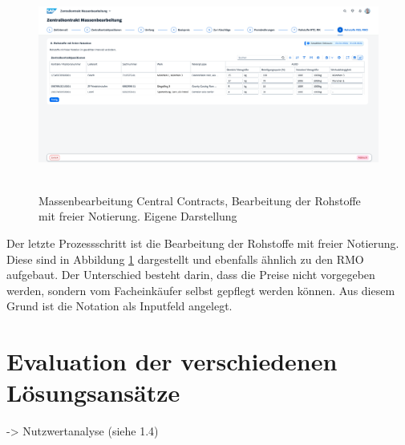 \begin{figure}[H]
    \centering
    \includegraphics[height=6.91cm]{Bilder/Praxisteil-KL-Schritt-8.png}
    \caption[Massenbearbeitung Central Contracts, Bearbeitung der Rohstoffe mit freier Notierung]{Massenbearbeitung Central Contracts, Bearbeitung der Rohstoffe mit freier Notierung. Eigene Darstellung}
    \label{fig:PraxisKLSchritt8}
\end{figure}

Der letzte Prozessschritt ist die Bearbeitung der Rohstoffe mit freier Notierung. Diese sind in Abbildung \ref{fig:PraxisKLSchritt8} dargestellt und ebenfalls ähnlich zu den RMO aufgebaut. Der Unterschied besteht darin, dass die Preise nicht vorgegeben werden, sondern vom Facheinkäufer selbst gepflegt werden können. Aus diesem Grund ist die Notation als Inputfeld angelegt.

\section{Evaluation der verschiedenen Lösungsansätze}

-> Nutzwertanalyse (siehe 1.4)